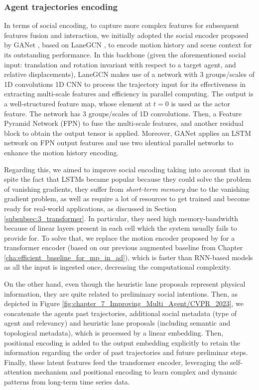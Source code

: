 \subsubsection{Agent trajectories encoding}
\label{subsubsec:7_improving_trajectories_encoding}

In terms of social encoding, to capture more complex features for subsequent features fusion and interaction, we initially adopted the social encoder proposed by GANet \cite{wang2022ganet}, based on LaneGCN \cite{liang2020learning}, to encode motion history and scene context for its outstanding performance. In this backbone (given the aforementioned social input: translation and rotation invariant with respect to a target agent, and relative displacements), LaneGCN makes use of a network with $3$ groups/scales of 1D convolutions 1D CNN to process the trajectory input for its effectiveness in extracting multi-scale features and efficiency in parallel computing. The output is a well-structured feature map, whose element at $t=0$ is used as the actor feature. The network has $3$ groups/scales of 1D convolutions. Then, a Feature Pyramid Network (FPN) \cite{lin2017feature} to fuse the multi-scale features, and another residual block to obtain the output tensor is applied. Moreover, GANet applies an \ac{LSTM} network on FPN output features and use two identical parallel networks to enhance the motion history encoding.

Regarding this, we aimed to improve social encoding taking into account that in spite the fact that \acp{LSTM} became popular because they could solve the problem of vanishing gradients, they suffer from \textit{short-term memory} due to the vanishing gradient problem, as well as require a lot of resources to get trained and become ready for real-world applications, as discussed in Section \ref{subsubsec:3_transformer}. In particular, they need high memory-bandwidth because of linear layers present in each cell which the system usually fails to provide for. To solve that, we replace the motion encoder proposed by \cite{wang2022ganet} for a transformer encoder (based on our previous augmented baseline from Chapter \ref{cha:efficient_baseline_for_mp_in_ad}), which is faster than \ac{RNN}-based models as all the input is ingested once, decreasing the computational complexity. 

On the other hand, even though the heuristic lane proposals represent physical information, they are quite related to preliminary social intentions. Then, as depicted in Figure \ref{fig:chapter_7_Improving_Multi_Agent/CVPR_2023}, we concatenate the agents past trajectories, additional social metadata (type of agent and relevancy) and heuristic lane proposals (including semantic and topological metadata), which is processed by a linear embedding. Then, positional encoding is added to the output embedding explicitly to retain the information regarding the order of past trajectories and future preliminar steps. Finally, these latent features feed the transformer encoder, leveraging the self-attention mechanism and positional encoding to learn complex and dynamic patterns from long-term time series data. 

